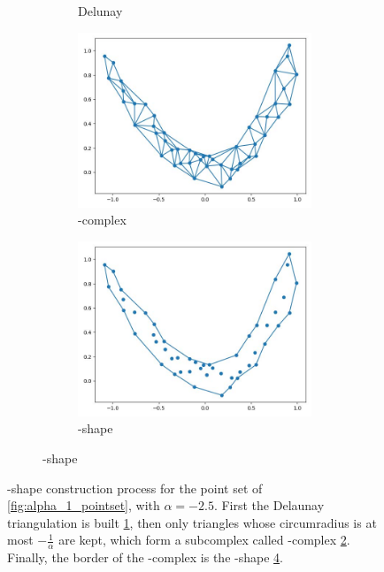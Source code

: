 \begin{figure}[h!]
\begin{subfigure}{1\textwidth}
\begin{subfigure}{0.24\textwidth}
      \caption{Delunay}
      \label{fig:delunay}
    \end{subfigure}
    \begin{subfigure}{0.24\textwidth}
      \centering
      \includegraphics[width=\textwidth]{Images/alpha_3.jpg}
      \caption{\textalpha-complex}
      \label{fig:alphacomplex}
    \end{subfigure}
    \begin{subfigure}{0.24\textwidth}
      \centering
      \includegraphics[width=\textwidth]{Images/alpha_4.jpg}
      \caption{\textalpha-shape}
      \label{fig:alphashape}
    \end{subfigure}
  \end{subfigure}
  \caption{\textalpha-shape construction process for the point set of
  \ref{fig:alpha_1_pointset}, with $\alpha = -2.5$. First the Delaunay triangulation is
  built \ref{fig:delunay}, then only triangles whose circumradius is at most
  $-\frac{1}{\alpha}$ are kept, which form a subcomplex called
  \textalpha-complex \ref{fig:alphacomplex}. Finally, the border of the
  \textalpha-complex is the \textalpha-shape \ref{fig:alphashape}.}
  \label{fig:alphabuild}
\end{figure}

